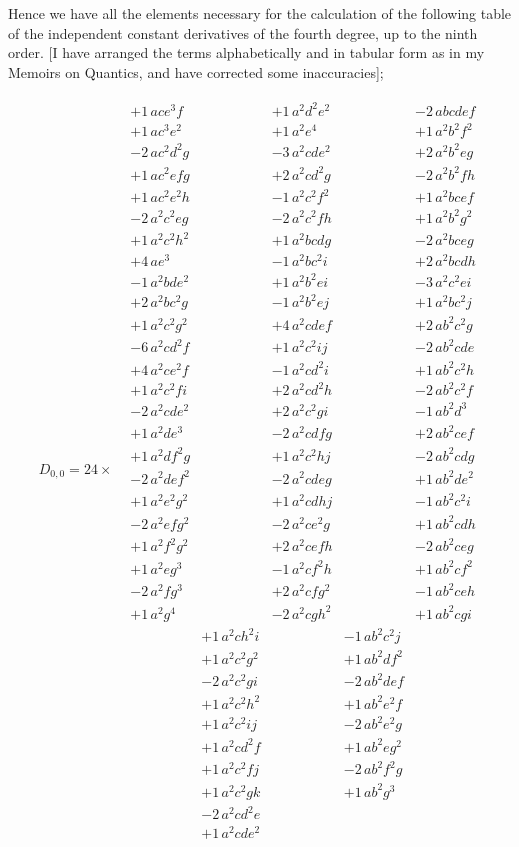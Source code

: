 \documentclass[11pt,a4paper]{book}
\begin{document}
Hence we have all the elements necessary for the calculation of the following table
of the independent constant derivatives of the fourth degree, up to the ninth order. [I
have arranged the terms alphabetically and in tabular form as in my Memoirs on
Quantics, and have corrected some inaccuracies];

\begin{gather*}
D_{0,0} = 24\times\begin{aligned}
&+1\, ace^3f &&+1\, a^2d^2e^2 &&-2\, abcdef\\
&+1\, ac^3e^2 &&+1\, a^2e^4 &&+1\, a^2b^2f^2\\
&-2\, ac^2d^2g &&-3\, a^2cde^2 &&+2\, a^2b^2eg\\
&+1\, ac^2efg &&+2\, a^2cd^2g &&-2\, a^2b^2fh\\
&+1\, ac^2e^2h &&-1\, a^2c^2f^2 &&+1\, a^2bcef\\
&-2\, a^2c^2eg &&-2\, a^2c^2fh &&+1\, a^2b^2g^2\\
&+1\, a^2c^2h^2 &&+1\, a^2bcdg &&-2\, a^2bceg\\
&+4\, ae^3 &&-1\, a^2bc^2i &&+2\, a^2bcdh\\
&-1\, a^2bde^2 &&+1\, a^2b^2ei &&-3\, a^2c^2ei\\
&+2\, a^2bc^2g &&-1\, a^2b^2ej &&+1\, a^2bc^2j\\
&+1\, a^2c^2g^2 &&+4\, a^2cdef &&+2\, ab^2c^2g\\
&-6\, a^2cd^2f &&+1\, a^2c^2ij &&-2\, ab^2cde\\
&+4\, a^2ce^2f &&-1\, a^2cd^2i &&+1\, ab^2c^2h\\
&+1\, a^2c^2fi &&+2\, a^2cd^2h &&-2\, ab^2c^2f\\
&-2\, a^2cde^2 &&+2\, a^2c^2gi &&-1\, ab^2d^3\\
&+1\, a^2de^3 &&-2\, a^2cdfg &&+2\, ab^2cef\\
&+1\, a^2df^2g &&+1\, a^2c^2hj &&-2\, ab^2cdg\\
&-2\, a^2def^2 &&-2\, a^2cdeg &&+1\, ab^2de^2\\
&+1\, a^2e^2g^2 &&+1\, a^2cdhj &&-1\, ab^2c^2i\\
&-2\, a^2efg^2 &&-2\, a^2ce^2g &&+1\, ab^2cdh\\
&+1\, a^2f^2g^2 &&+2\, a^2cefh &&-2\, ab^2ceg\\
&+1\, a^2eg^3 &&-1\, a^2cf^2h &&+1\, ab^2cf^2\\
&-2\, a^2fg^3 &&+2\, a^2cfg^2 &&-1\, ab^2ceh\\
&+1\, a^2g^4 &&-2\, a^2cgh^2 &&+1\, ab^2cgi\\
&&+1\, a^2ch^2i &&-1\, ab^2c^2j\\
&&+1\, a^2c^2g^2 &&+1\, ab^2df^2\\
&&-2\, a^2c^2gi &&-2\, ab^2def\\
&&+1\, a^2c^2h^2 &&+1\, ab^2e^2f\\
&&+1\, a^2c^2ij &&-2\, ab^2e^2g\\
&&+1\, a^2cd^2f &&+1\, ab^2eg^2\\
&&+1\, a^2c^2fj &&-2\, ab^2f^2g\\
&&+1\, a^2c^2gk &&+1\, ab^2g^3\\
&&-2\, a^2cd^2e &&\\
&&+1\, a^2cde^2 &
\end{aligned}
\end{gather*}
\end{document}
